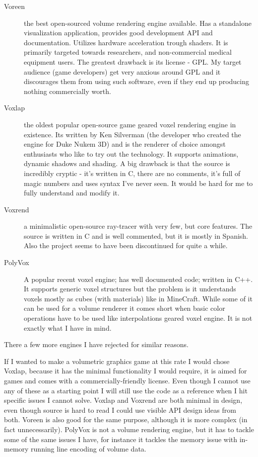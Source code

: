 \documentclass[11pt,fleqn,twoside]{article}
\begin{document}
\begin{description}
	\item[Voreen\cite{Volreen}]
	the best open-sourced volume rendering engine available. Has a standalone visualization application, provides good development API and documentation. Utilizes hardware acceleration trough shaders. It is primarily targeted towards researchers, and non-commercial medical equipment users. The greatest drawback is its license - GPL. My target audience (game developers) get very anxious around GPL and it discourages them from using such software, even if they end up producing nothing commercially worth.
	\item[Voxlap\cite{Voxlap}]
	the oldest popular open-source game geared voxel rendering engine in existence. Its written by Ken Silverman (the developer who created the engine for Duke Nukem 3D) and is the renderer of choice amongst enthusiasts who like to try out the technology. It supports animations, dynamic shadows and shading. A big drawback is that the source is incredibly cryptic - it's written in C, there are no comments, it's full of magic numbers and uses syntax I've never seen. It would be hard for me to fully understand and modify it.
	\item[Voxrend\cite{VoxRend}]
	a minimalistic open-source ray-tracer with very few, but core features. The source is written in C and is well commented, but it is mostly in Spanish. Also the project seems to have been discontinued for quite a while.
	\item[PolyVox\cite{PolyVox}]
	A popular recent voxel engine; has well documented code; written in C++. It supports generic voxel structures but the problem is it understands voxels mostly as cubes (with materials) like in MineCraft. While some of it can be used for a volume renderer it comes short when basic color operations have to be used like interpolations geared voxel engine. It is not exactly what I have in mind.
\end{description}

There a few more engines I have rejected for similar reasons.

If I wanted to make a volumetric graphics game at this rate I would chose Voxlap, because it has the minimal functionality I would require, it is aimed for games and comes with a commercially-friendly license. Even though I cannot use any of these as a starting point I will still use the code as a reference when I hit specific issues I cannot solve. Voxlap and Voxrend are both minimal in design, even though source is hard to read I could use visible API design ideas from both. Voreen is also good for the same purpose, although it is more complex (in fact unnecessarily). PolyVox is not a volume rendering engine, but it has to tackle some of the same issues I have, for instance it tackles the memory issue with in-memory running line encoding of volume data.
\end{document}
